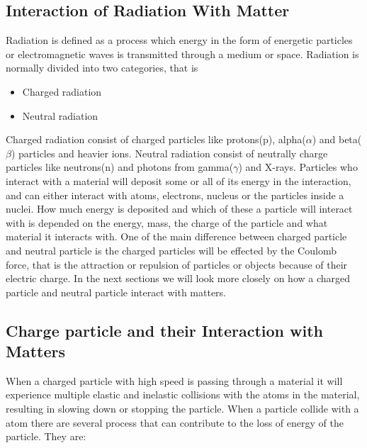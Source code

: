 \documentclass[12pt]{article}
\numberwithin{figure}{section}
\begin{document}
\subsection{Interaction of Radiation With Matter}
Radiation is defined as a process which energy in the form of energetic particles or electromagnetic waves is transmitted through a medium or space.
Radiation is normally divided into two categories, that is
\begin{itemize}
  \item Charged radiation
  \item Neutral radiation
\end{itemize}
Charged radiation consist of charged particles like protons(p), alpha($\alpha$) and beta($\beta$) particles and heavier ions.
Neutral radiation consist of neutrally charge particles like neutrons(n) and photons from gamma($\gamma$) and X-rays. 
Particles who interact with a material will deposit some or all of its energy in the interaction, and can either interact with atoms, electrons, nucleus or the particles inside a nuclei.
How much energy is deposited and which of these a particle will interact with is depended on the energy, mass, the charge of the particle and what material it interacts with.
One of the main difference between charged particle and neutral particle is the charged particles will be effected by the Coulomb force,
that is the attraction or repulsion of particles or objects because of their electric charge.
In the next sections we will look more closely on how a charged particle and neutral particle interact with matters.

\subsection{Charge particle and their Interaction with Matters}
When a charged particle with high speed is passing through a material it will experience multiple elastic and inelastic collisions with the atoms in the material, resulting in slowing down or stopping the particle.
When a particle collide with a atom there are several process that can contribute to the loss of energy of the particle. They are:
\end{document}

